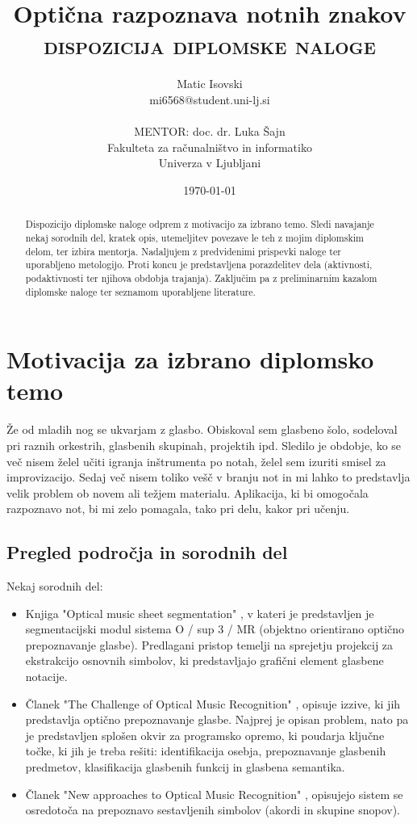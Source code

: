\documentclass[11pt,a4paper]{article}
\title{Optična razpoznava notnih znakov\\
\textsc{dispozicija diplomske naloge}}
\author{Matic Isovski\\
mi6568@student.uni-lj.si\\
\ \\
MENTOR: doc. dr. Luka Šajn \\
Fakulteta za računalništvo in informatiko\\ 
Univerza v Ljubljani
\date{\today}         
}
\begin{document}
\maketitle

\begin{abstract}
Dispozicijo diplomske naloge odprem z motivacijo za izbrano temo. Sledi navajanje nekaj sorodnih del, kratek opis, utemeljitev povezave le teh z mojim diplomskim delom, ter izbira mentorja. Nadaljujem z predvidenimi prispevki naloge ter uporabljeno metologijo. Proti koncu je predstavljena porazdelitev dela (aktivnosti, podaktivnosti ter njihova obdobja trajanja). Zaključim pa z preliminarnim kazalom diplomske naloge ter seznamom uporabljene literature.
\end{abstract}


\section{Motivacija za izbrano diplomsko temo}

Že od mladih nog se ukvarjam z glasbo. Obiskoval sem glasbeno šolo, sodeloval pri raznih orkestrih, glasbenih skupinah, projektih ipd. Sledilo je obdobje, ko se več nisem želel učiti igranja inštrumenta po notah, želel sem izuriti smisel za improvizacijo. Sedaj več nisem toliko vešč v branju not in mi lahko to predstavlja velik problem ob novem ali težjem materialu. Aplikacija, ki bi omogočala razpoznavo not, bi mi zelo pomagala, tako pri delu, kakor pri učenju.

\subsection{Pregled področja in sorodnih del}

Nekaj sorodnih del:
\begin{itemize}
\item
Knjiga "Optical music sheet segmentation" \cite{omss}, v kateri je predstavljen je segmentacijski modul sistema O / sup 3 / MR (objektno orientirano optično prepoznavanje glasbe). Predlagani pristop temelji na sprejetju projekcij za ekstrakcijo osnovnih simbolov, ki predstavljajo grafični element glasbene notacije.
\item
Članek "The Challenge of Optical Music Recognition" \cite{tcomr}, opisuje izzive, ki jih predstavlja optično prepoznavanje glasbe. Najprej je opisan problem, nato pa je predstavljen splošen okvir za programsko opremo, ki poudarja ključne točke, ki jih je treba rešiti: identifikacija osebja, prepoznavanje glasbenih predmetov, klasifikacija glasbenih funkcij in glasbena semantika.
\item
Članek "New approaches to Optical Music Recognition" \cite{naomr}, opisujejo sistem se osredotoča na prepoznavo sestavljenih simbolov (akordi in skupine snopov).
\end{itemize}
\end{document}
